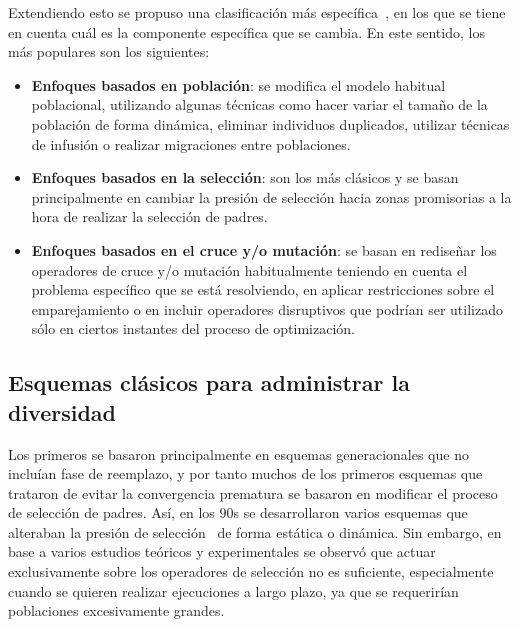 Extendiendo esto se propuso una clasificación más específica~\cite{Crepinsek:13}, en los que se tiene en cuenta cuál es la componente específica que se cambia.
%
En este sentido, los más populares son los siguientes:

\begin{itemize}
\item \textbf{Enfoques basados en población}: se modifica el modelo habitual poblacional, utilizando algunas técnicas como hacer variar el tamaño de la población de forma
dinámica, eliminar individuos duplicados, utilizar técnicas de infusión o realizar migraciones entre poblaciones.
%
\item \textbf{Enfoques basados en la selección}: son los más clásicos y se basan principalmente en cambiar la presión de selección hacia zonas promisorias a la hora de realizar
la selección de padres.
%
\item \textbf{Enfoques basados en el cruce y/o mutación}: se basan en rediseñar los operadores de cruce y/o mutación habitualmente teniendo en cuenta el problema específico
que se está resolviendo, en aplicar restricciones sobre el emparejamiento o en incluir operadores disruptivos que podrían ser utilizado sólo en ciertos instantes del proceso
de optimización.
\end{itemize}


\subsection{Esquemas clásicos para administrar la diversidad}

Los primeros \EAS{} se basaron principalmente en esquemas generacionales que no incluían fase de reemplazo, y por tanto
muchos de los primeros esquemas que trataron de evitar la convergencia prematura se basaron en modificar el proceso de selección
de padres.
%
Así, en los 90s se desarrollaron varios esquemas que alteraban la presión de selección~\cite{eiben2003introduction}
de forma estática o dinámica.
%
Sin embargo, en base a varios estudios teóricos y experimentales se observó que actuar exclusivamente sobre los operadores de selección no es suficiente, especialmente
cuando se quieren realizar ejecuciones a largo plazo, ya que se requerirían poblaciones excesivamente grandes.

